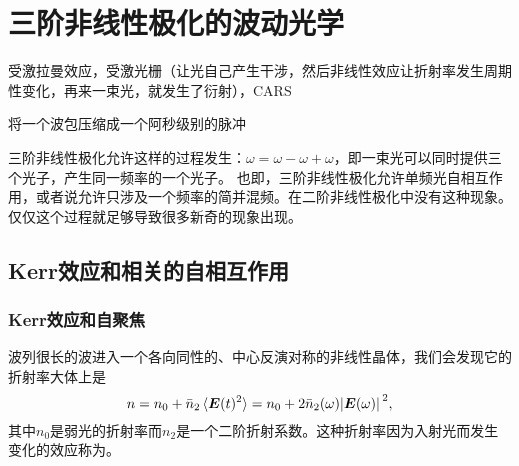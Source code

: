 \section{三阶非线性极化的波动光学}\label{sec:chi-3-wave}

受激拉曼效应，受激光栅（让光自己产生干涉，然后非线性效应让折射率发生周期性变化，再来一束光，就发生了衍射），CARS

将一个波包压缩成一个阿秒级别的脉冲

三阶非线性极化允许这样的过程发生：$\omega = \omega - \omega + \omega$，即一束光可以同时提供三个光子，产生同一频率的一个光子。
也即，三阶非线性极化允许单频光自相互作用，或者说允许只涉及一个频率的简并混频。在二阶非线性极化中没有这种现象。
仅仅这个过程就足够导致很多新奇的现象出现。

\subsection{Kerr效应和相关的自相互作用}

\subsubsection{Kerr效应和自聚焦}

波列很长的波进入一个各向同性的、中心反演对称的非线性晶体，我们会发现它的折射率大体上是
\begin{equation}
    n = n_0 + \bar{n}_2 \expval*{\vb*{E}(t)^2} = n_0 + 2 \bar{n}_2(\omega) \abs*{\vb*{E}(\omega)}^2,
    \label{eq:ref-index-change}
\end{equation}
其中$n_0$是弱光的折射率而$n_2$是一个二阶折射系数。这种折射率因为入射光而发生变化的效应称为。

